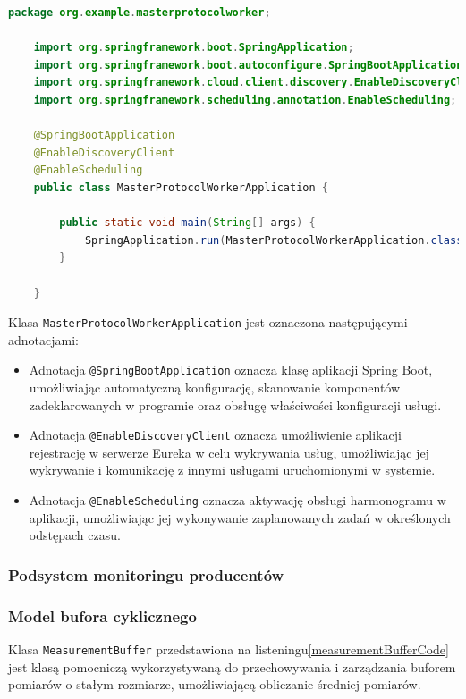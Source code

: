 \begin{lstlisting}[language=Java, caption=Główna klasa węzła protokołu, label=protocolWorkerMainClass]
    package org.example.masterprotocolworker;

    import org.springframework.boot.SpringApplication;
    import org.springframework.boot.autoconfigure.SpringBootApplication;
    import org.springframework.cloud.client.discovery.EnableDiscoveryClient;
    import org.springframework.scheduling.annotation.EnableScheduling;
    
    @SpringBootApplication
    @EnableDiscoveryClient
    @EnableScheduling
    public class MasterProtocolWorkerApplication {
    
        public static void main(String[] args) {
            SpringApplication.run(MasterProtocolWorkerApplication.class, args);
        }
    
    }
\end{lstlisting}

Klasa \verb|MasterProtocolWorkerApplication| jest oznaczona następującymi adnotacjami:
\begin{itemize}
    \item Adnotacja \verb|@SpringBootApplication| oznacza klasę aplikacji Spring Boot, umożliwiając automatyczną konfigurację, skanowanie komponentów zadeklarowanych w programie oraz obsługę właściwości konfiguracji usługi.
    \item Adnotacja \verb|@EnableDiscoveryClient| oznacza umożliwienie aplikacji rejestrację w serwerze Eureka w celu wykrywania usług, umożliwiając jej wykrywanie i komunikację z innymi usługami uruchomionymi w systemie.
    \item Adnotacja \verb|@EnableScheduling| oznacza aktywację obsługi harmonogramu w aplikacji, umożliwiając jej wykonywanie zaplanowanych zadań w określonych odstępach czasu.
\end{itemize}

\subsubsection{Podsystem monitoringu producentów}

\subsubsection{Model bufora cyklicznego}

Klasa \verb|MeasurementBuffer| przedstawiona na listeningu\ref{measurementBufferCode} jest klasą pomocniczą wykorzystywaną do przechowywania i zarządzania buforem pomiarów o stałym rozmiarze, umożliwiającą obliczanie średniej pomiarów.

